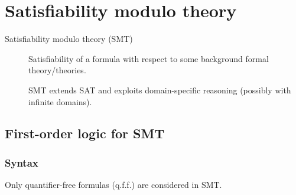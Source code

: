 \chapter{Satisfiability modulo theory}

\begin{description}
    \item[Satisfiability modulo theory (SMT)] 
        Satisfiability of a formula with respect to some background formal theory/theories.

        SMT extends SAT and exploits domain-specific reasoning (possibly with infinite domains).
\end{description}



\section{First-order logic for SMT}


\subsection{Syntax}

\begin{remark}
    Only quantifier-free formulas (q.f.f.) are considered in SMT.
\end{remark}

